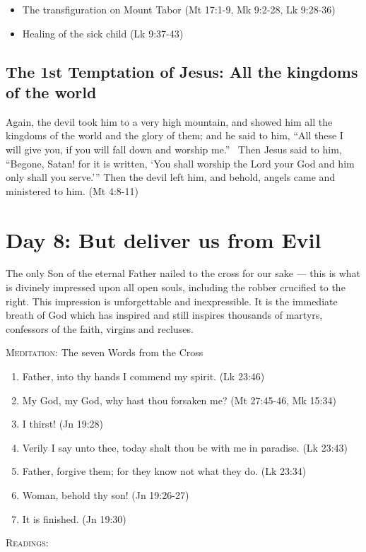 \begin{itemize}
\item The transfiguration on Mount Tabor (Mt 17:1-9, Mk 9:2-28, Lk 9:28-36) 
\item Healing of the sick child (Lk 9:37-43) 
\end{itemize}

\subsection{The 1st Temptation of Jesus: All the kingdoms of the world}
Again, the devil took him to a very high mountain, and showed him all the kingdoms of the world and the glory of them; and he said to him, “All these I will give you, if you will fall down and worship me.”  Then Jesus said to him, “Begone, Satan! for it is written, `You shall worship the Lord your God and him only shall you serve.'” Then the devil left him, and behold, angels came and ministered to him. (Mt 4:8-11)

\section{Day 8: But deliver us from Evil}
\begin{quotationx}
The only Son of the eternal Father nailed to the cross for our sake — this is what is divinely
impressed upon all open souls, including the robber crucified to the right. This impression is unforgettable and inexpressible. It is the immediate breath of God which has inspired and still inspires thousands of martyrs, confessors of the faith, virgins and recluses. 


\end{quotationx}
\textsc{Meditation}: The seven Words from the Cross

\begin{enumerate}
\item Father, into thy hands I commend my spirit. (Lk 23:46) 
\item My God, my God, why hast thou forsaken me? (Mt 27:45-46, Mk 15:34) 
\item I thirst! (Jn 19:28) 
\item Verily I say unto thee, today shalt thou be with me in paradise. (Lk 23:43) 
\item Father, forgive them; for they know not what they do. (Lk 23:34) 
\item Woman, behold thy son! (Jn 19:26-27) 
\item It is finished. (Jn 19:30) 
\end{enumerate}
\textsc{Readings}:

